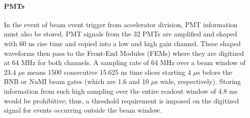 \paragraph{PMTs}
In the event of beam event trigger from accelerator division, PMT information must also be stored. PMT signals from the 32 PMTs are amplified and shaped with 60 ns rise time and copied into a low and high gain channel. These shaped waveforms then pass to the Front-End Modules (FEMs) where they are digitized at 64 MHz for both channels. A sampling rate of 64 MHz over a beam window of 23.4 $\mu$s means 1500 consecutive 15.625 ns time slices starting 4 $\mu$s before the BNB or NuMI beam gates (which are 1.6 and 10 $\mu$s wide, respectively). Storing information from such high sampling over the entire readout window of 4.8 ms would be prohibitive; thus, a threshold requirement is imposed on the digitized signal for events occurring outside the beam window. \\


